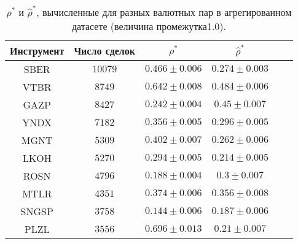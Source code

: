 \begin{table}[h!]
    \begin{center}
        \begin{tabular}{|c|c|c|c|c|c|}
            \hline
            Инструмент & Число сделок & $\rho^*$ & $\hat \rho^*$           \\ \hline
            SBER & $10079$ & $0.466 \pm 0.006$ & $0.274 \pm 0.003$ \\ \hline
            VTBR       & $8749$       & $0.642 \pm 0.008$ & $0.484 \pm 0.006$ \\ \hline
            GAZP       & $8427$       & $0.242 \pm 0.004$ & $0.45 \pm 0.007$  \\ \hline
            YNDX       & $7182$       & $0.356 \pm 0.005$ & $0.296 \pm 0.005$ \\ \hline
            MGNT       & $5309$       & $0.402 \pm 0.007$ & $0.262 \pm 0.006$ \\ \hline
            LKOH       & $5270$       & $0.294 \pm 0.005$ & $0.214 \pm 0.005$ \\ \hline
            ROSN       & $4796$       & $0.188 \pm 0.004$ & $0.3 \pm 0.007$   \\ \hline
            MTLR       & $4351$       & $0.374 \pm 0.006$ & $0.356 \pm 0.008$ \\ \hline
            SNGSP      & $3758$       & $0.144 \pm 0.006$ & $0.187 \pm 0.006$ \\ \hline
            PLZL       & $3556$       & $0.696 \pm 0.013$ & $0.21 \pm 0.007$  \\ \hline
        \end{tabular}
    \end{center}\caption{$\rho^*$ и $\hat \rho^*$, вычисленные для разных валютных пар в агрегированном датасете (величина промежутка1.0).}
    \label{Aggreg1CU1.0} \end{table}

